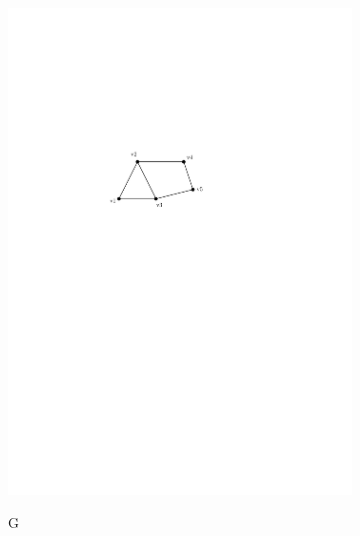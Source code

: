 \documentclass[12pt,a4paper]{article}
\begin{document}
\begin{figure}[h]
\centering
\begin{subfigure}{0.42\textwidth}
\centering
\includegraphics[width = \textwidth]{../media/iso1.pdf} \\
\caption{G}
\label{fig:iso1}
\end{subfigure}
\hspace{2cm}
\begin{subfigure}{0.30\textwidth}
\centering

\end{subfigure}
\end{figure}
\end{document}
